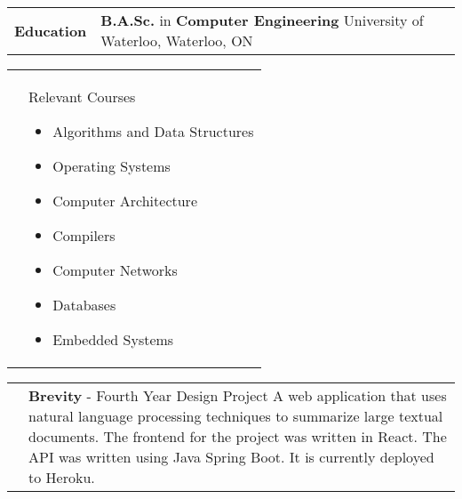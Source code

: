 \documentclass[letter, 10.5pt]{article}
\newcommand\sectionspacing{0.6cm}
\newcommand\workspacing{0.4cm}
\newcommand\bulletspacing{-0.15cm}
\newcommand\firstcolwidth{2.5cm}
\newcommand\listwidth{0.809\textwidth}
\begin{document}
    \newline
    \vspace{\sectionspacing}
    \newline
    \begin{tabularx}{\textwidth}{@{}p{\firstcolwidth}X}
        \textbf{Education} & 
        \textbf{B.A.Sc.} in \textbf{Computer Engineering} 
        \newline
        University of Waterloo, Waterloo, ON \\
    \end{tabularx}
    \newline
    \vspace{\workspacing}
    \newline
    \begin{tabularx}{\textwidth}{@{}p{\firstcolwidth}X}
        & 
        Relevant Courses
        \newline
        \begin{minipage}[t]{\listwidth}
            \begin{itemize}
                \vspace{-0.3cm}
                \item Algorithms and Data Structures
                \vspace{\bulletspacing}
                \item Operating Systems
                \vspace{\bulletspacing}
                \item Computer Architecture
                \vspace{\bulletspacing}
                \item Compilers
                \vspace{\bulletspacing}
                \item Computer Networks
                \vspace{\bulletspacing}
                \item Databases
                \vspace{\bulletspacing}
                \item Embedded Systems
            \end{itemize}
        \end{minipage} \\
    \end{tabularx}
    \newline
    \vspace{0.6cm}
    \newline
    \begin{tabularx}{\textwidth}{@{}p{\firstcolwidth}X}
        & \textbf{Brevity} - Fourth Year Design Project
        \newline
        \vspace{-0.3cm}
        \newline
        A web application that uses natural language processing techniques to summarize large textual documents. The frontend for the project was written in React. The API was written using Java Spring Boot. It is currently deployed to Heroku. \\
    \end{tabularx}
\end{document}
